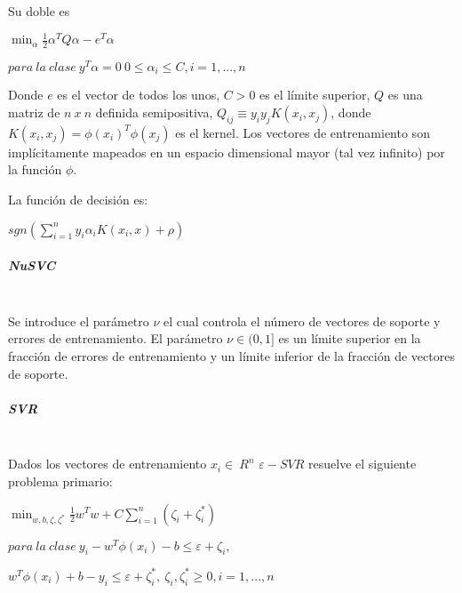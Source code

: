 Su doble es

\begin{center}
	$\min_{\alpha} \frac{1}{2} \alpha^T Q \alpha - e^T \alpha$
\end{center}
\begin{center}
	$para\ la\ clase\ y^T \alpha = 0\ 0 \leq \alpha_i \leq C, i=1, ..., n$
\end{center}

Donde $e$ es el vector de todos los unos, $C > 0$ es el límite superior, $Q$ es una matriz de $n\ x\ n$ definida semipositiva, $Q_{ij} \equiv y_i y_j K(x_i, x_j)$, donde $K(x_i, x_j) = \phi (x_i)^T \phi (x_j)$ es el kernel. Los vectores de entrenamiento son implícitamente mapeados en un espacio dimensional mayor (tal vez infinito) por la función $\phi$.

La función de decisión es:

\begin{center}
	$sgn(\sum_{i=1}^n y_i \alpha_i K(x_i, x) + \rho)$
\end{center}

\subparagraph{NuSVC\\\\}

Se introduce el parámetro $\nu$ el cual controla el número de vectores de soporte y errores de
entrenamiento. El parámetro $\nu \in (0, 1]$ es un límite superior en la fracción de errores de
entrenamiento y un límite inferior de la fracción de vectores de soporte.

\subparagraph{SVR\\\\}

Dados los vectores de entrenamiento  $x_{i} \in\ R^n$  
$\varepsilon-SVR$ \cite{smola2004tutorial} resuelve el siguiente problema primario:

\begin{center}
	
	$\min_ {w, b, \zeta, \zeta^*} \frac{1}{2} w^T w + C \sum_{i=1}^{n} (\zeta_i + \zeta_i^*)
	$
\end{center}

\begin{center}
	
	$para\ la\ clase\ y_i - w^T \phi (x_i) - b \leq \varepsilon + \zeta_i,$
\end{center}
\begin{center}
	$w^T \phi (x_i) + b - y_i \leq \varepsilon + \zeta_i^*,\ \zeta_i, \zeta_i^* \geq 0, i=1, ..., n$	
\end{center}


